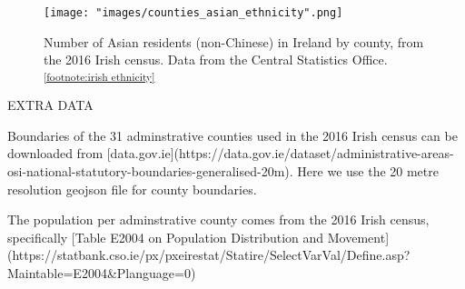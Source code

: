 \documentclass[a4paper,11pt]{article}
\begin{document}
\begin{figure}[htb]
   \centering
   \texttt{[image: "images/counties\_asian\_ethnicity".png]}
      \caption{Number of Asian residents (non-Chinese) in Ireland by county, from the 2016 Irish census. Data from the Central Statistics Office.\textsuperscript{\ref{footnote:irish ethnicity}}}
      \label{fig:asian by county}
\end{figure}

EXTRA DATA

Boundaries of the 31 adminstrative counties used in the 2016 Irish census can be downloaded from [data.gov.ie](https://data.gov.ie/dataset/administrative-areas-osi-national-statutory-boundaries-generalised-20m). Here we use the 20 metre resolution geojson file for county boundaries.


The population per adminstrative county comes from the 2016 Irish census, specifically [Table E2004 on Population Distribution and Movement](https://statbank.cso.ie/px/pxeirestat/Statire/SelectVarVal/Define.asp?Maintable=E2004&Planguage=0)








\end{document}
